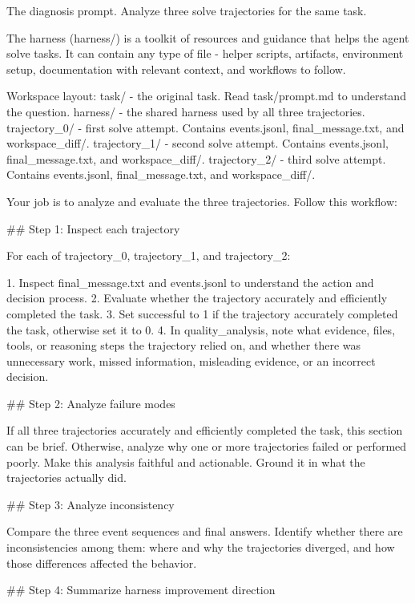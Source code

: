 \begin{promptbox}{The diagnosis prompt.}
Analyze three solve trajectories for the same task.

The harness (harness/) is a toolkit of resources and guidance that helps the agent solve tasks. It can contain any type of file - helper scripts, artifacts, environment setup, documentation with relevant context, and workflows to follow.

Workspace layout:
  task/              - the original task. Read task/prompt.md to understand the question.
  harness/           - the shared harness used by all three trajectories.
  trajectory_0/      - first solve attempt. Contains events.jsonl, final_message.txt, and workspace_diff/.
  trajectory_1/      - second solve attempt. Contains events.jsonl, final_message.txt, and workspace_diff/.
  trajectory_2/      - third solve attempt. Contains events.jsonl, final_message.txt, and workspace_diff/.

Your job is to analyze and evaluate the three trajectories. Follow this workflow:

## Step 1: Inspect each trajectory

For each of trajectory_0, trajectory_1, and trajectory_2:

1. Inspect final_message.txt and events.jsonl to understand the action and decision process.
2. Evaluate whether the trajectory accurately and efficiently completed the task.
3. Set successful to 1 if the trajectory accurately completed the task, otherwise set it to 0.
4. In quality_analysis, note what evidence, files, tools, or reasoning steps the trajectory relied on, and whether there was unnecessary work, missed information, misleading evidence, or an incorrect decision.

## Step 2: Analyze failure modes

If all three trajectories accurately and efficiently completed the task, this section can be brief. Otherwise, analyze why one or more trajectories failed or performed poorly. Make this analysis faithful and actionable. Ground it in what the trajectories actually did.

## Step 3: Analyze inconsistency

Compare the three event sequences and final answers. Identify whether there are inconsistencies among them: where and why the trajectories diverged, and how those differences affected the behavior.

## Step 4: Summarize harness improvement direction


\end{promptbox}
